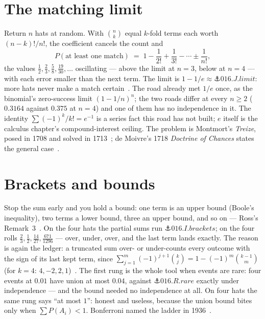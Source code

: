 \begin{narrative}
\section{The matching limit}

Return $n$ hats at random. With $\binom{n}{k}$ equal $k$-fold terms
each worth $(n-k)!/n!$, the coefficient cancels the count and
\[
  P(\text{at least one match}) \;=\;
  1 - \frac{1}{2!} + \frac{1}{3!} - \cdots \pm \frac{1}{n!} ,
\]
the values $\tfrac12, \tfrac23, \tfrac58, \tfrac{19}{30}, \dots$
oscillating — above the limit at $n = 3$, below at $n = 4$ — with
each error smaller than the next term. The limit is
$1 - 1/e \approx \anchor{016.J.limit}$: more hats never make a match
certain~\cite{probability-wikipedia-derangement}. The road already
met $1/e$ once, as the binomial's zero-success limit $(1 - 1/n)^n$;
the two roads differ at every $n \ge 2$ ($0.3164$ against $0.375$ at
$n = 4$) and one of them has no independence in it. The identity
$\sum (-1)^k / k! = e^{-1}$ is a series fact this road has not built;
$e$ itself is the calculus chapter's compound-interest ceiling. The
problem is Montmort's \emph{Treize}, posed in 1708 and solved in
1713~\cite{probability-o-connor-and-robertson-montmort-s-probl-me-du-treize-mactuto};
de Moivre's 1718 \emph{Doctrine of Chances} states the general
case~\cite{probability-abraham-de-moivre-the-doctrine-of-chances-london-1718}.

\section{Brackets and bounds}

Stop the sum early and you hold a bound: one term is an upper bound
(Boole's inequality), two terms a lower bound, three an upper bound,
and so on — Ross's Remark~3~\cite{probability-sheldon-ross-a-first-course-in-probability-10th-ed-pearson-2}.
On the four hats the partial sums run $\anchor{016.I.brackets}$; on
the four rolls $\tfrac23, \tfrac12, \tfrac{14}{27}, \tfrac{671}{1296}$
— over, under, over, and the last term lands exactly. The reason is
again the ledger: a truncated sum over- or under-counts every outcome
with the sign of its last kept term, since $\sum_{j=1}^{m} (-1)^{j+1}
\binom{k}{j} = 1 - (-1)^m \binom{k-1}{m}$ (for $k = 4$: $4, -2, 2, 1$)~\cite{probability-benjamin-and-quinn-an-alternate-approach-to-alternating-sums}.
The first rung is the whole tool when events are rare: four events
at $0.01$ have union at most $0.04$, against $\anchor{016.R.rare}$
exactly under independence — and the bound needed no independence at
all. On four hats the same rung says ``at most $1$'': honest and
useless, because the union bound bites only when $\sum P(A_i) < 1$.
Bonferroni named the ladder in 1936~\cite{probability-wikipedia-boole-s-inequality}.


\end{narrative}
